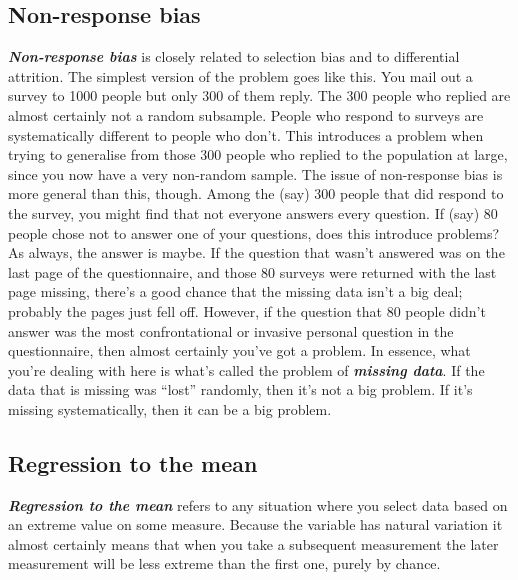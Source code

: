 \documentclass[
]{book}
\begin{document}
\hypertarget{non-response-bias}{%
\subsection{Non-response bias}\label{non-response-bias}}

\textbf{\emph{Non-response bias}} is closely related to selection bias and to differential attrition. The simplest version of the problem goes like this. You mail out a survey to 1000 people but only 300 of them reply. The 300 people who replied are almost certainly not a random subsample. People who respond to surveys are systematically different to people who don't. This introduces a problem when trying to generalise from those 300 people who replied to the population at large, since you now have a very non-random sample. The issue of non-response bias is more general than this, though. Among the (say) 300 people that did respond to the survey, you might find that not everyone answers every question. If (say) 80 people chose not to answer one of your questions, does this introduce problems? As always, the answer is maybe. If the question that wasn't answered was on the last page of the questionnaire, and those 80 surveys were returned with the last page missing, there's a good chance that the missing data isn't a big deal; probably the pages just fell off. However, if the question that 80 people didn't answer was the most confrontational or invasive personal question in the questionnaire, then almost certainly you've got a problem. In essence, what you're dealing with here is what's called the problem of \textbf{\emph{missing data}}. If the data that is missing was ``lost'' randomly, then it's not a big problem. If it's missing systematically, then it can be a big problem.

\hypertarget{regression-to-the-mean}{%
\subsection{Regression to the mean}\label{regression-to-the-mean}}

\textbf{\emph{Regression to the mean}} refers to any situation where you select data based on an extreme value on some measure. Because the variable has natural variation it almost certainly means that when you take a subsequent measurement the later measurement will be less extreme than the first one, purely by chance.
\end{document}

